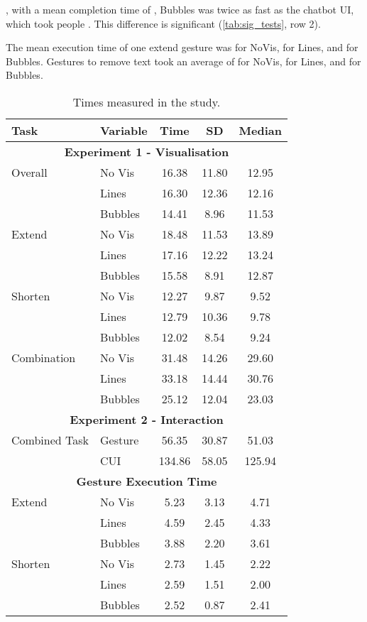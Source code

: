, with a mean completion time of , Bubbles was twice as fast as the chatbot UI, which took people .
This difference is significant (\cref{tab:sig_tests}, row 2).

The mean execution time of one extend gesture was  for NoVis,  for Lines, and  for Bubbles.
Gestures to remove text took an average of  for NoVis,  for Lines, and  for Bubbles.


\begin{table}[t]
\footnotesize
\centering
\begin{tabular}{llccc}
\toprule
\textbf{Task} & \textbf{Variable} & \textbf{Time} & \textbf{SD} & \textbf{Median} \\
\midrule
\multicolumn{5}{c}{\textbf{Experiment 1 - Visualisation}} \medskip\\
Overall & No Vis & 16.38 & 11.80 & 12.95 \\
 & Lines & 16.30 & 12.36 & 12.16 \\
 & Bubbles & 14.41 & 8.96 & 11.53 \medskip\\
Extend & No Vis & 18.48 & 11.53 & 13.89 \\
 & Lines & 17.16 & 12.22 & 13.24 \\
 & Bubbles & 15.58 & 8.91 & 12.87 \medskip\\
Shorten & No Vis & 12.27 & 9.87 & 9.52 \\
 & Lines & 12.79 & 10.36 & 9.78 \\
 & Bubbles & 12.02 & 8.54 & 9.24 \medskip\\
Combination & No Vis & 31.48 & 14.26 & 29.60 \\
 & Lines & 33.18 & 14.44 & 30.76 \\
 & Bubbles & 25.12 & 12.04 & 23.03 \medskip\\
\midrule
\multicolumn{5}{c}{\textbf{Experiment 2 - Interaction}} \medskip\\
Combined Task & Gesture & 56.35 & 30.87 & 51.03 \\
 & CUI & 134.86 & 58.05 & 125.94 \medskip\\
\midrule
\multicolumn{5}{c}{\textbf{Gesture Execution Time}} \medskip\\
Extend & No Vis & 5.23 & 3.13 & 4.71 \\
 & Lines & 4.59 & 2.45 & 4.33 \\
 & Bubbles & 3.88 & 2.20 & 3.61 \medskip\\
Shorten & No Vis & 2.73 & 1.45 & 2.22 \\
 & Lines & 2.59 & 1.51 & 2.00 \\
 & Bubbles & 2.52 & 0.87 & 2.41 \\
\bottomrule
\end{tabular}
\caption{Times measured in the study.}
\label{tab:time}
\end{table}








